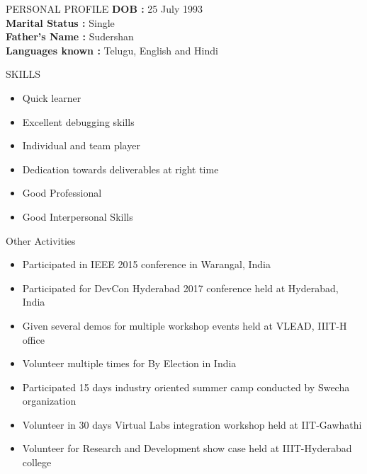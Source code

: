 \documentclass{resume} %
\begin{document}
\begin{rSection}{PERSONAL PROFILE}
  \textbf {DOB :} 25 July 1993\\
  \textbf {Marital Status :} Single \\
  \textbf {Father's Name : } Sudershan \\
  \textbf {Languages known :} Telugu, English and Hindi \\

\end{rSection}

\begin{rSection}{SKILLS}
  \begin{itemize}
  \item Quick learner
  \item Excellent debugging skills
  \item Individual and team player
  \item Dedication towards deliverables at right time
  \item Good Professional
  \item Good Interpersonal Skills

  \end{itemize}

\end{rSection}

\begin{rSection}{Other Activities}
\begin{itemize}
\item Participated in IEEE 2015 conference in Warangal, India
\item Participated for DevCon Hyderabad 2017 conference held
  at Hyderabad, India
\item Given several demos for multiple workshop events held
  at VLEAD, IIIT-H office
\item Volunteer multiple times for By Election in India
\item Participated 15 days industry oriented summer camp
  conducted by Swecha organization
\item Volunteer in 30 days Virtual Labs integration workshop
  held at IIT-Gawhathi
\item Volunteer for Research and Development show case held
  at IIIT-Hyderabad college
 
\end{itemize}
\end{rSection}
\end{document}
